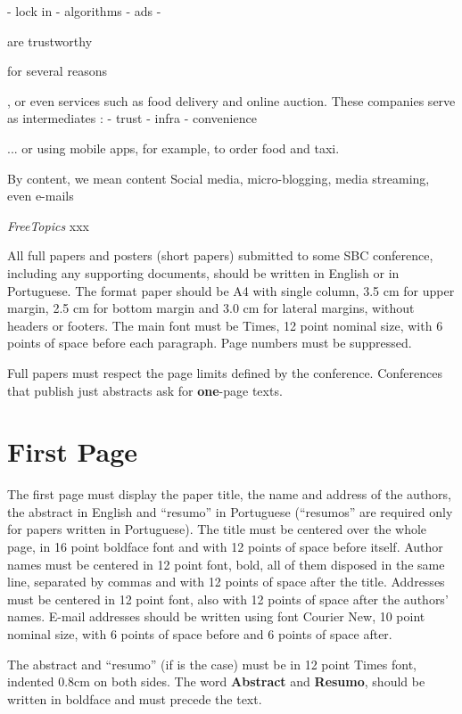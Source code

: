 \documentclass[12pt]{article}
\newcommand{\FC}{\emph{FreeTopics}\xspace}
\begin{document}
- lock in
- algorithms
- ads
- 

are trustworthy


for several reasons



, or even services such as food delivery and
online auction.
These companies serve as intermediates :
    - trust
    - infra
    - convenience

... or using mobile apps, for example, to order food and
taxi.

By content, we mean
content
Social media, micro-blogging, media streaming, even e-mails

\FC xxx

All full papers and posters (short papers) submitted to some SBC conference,
including any supporting documents, should be written in English or in
Portuguese. The format paper should be A4 with single column, 3.5 cm for upper
margin, 2.5 cm for bottom margin and 3.0 cm for lateral margins, without
headers or footers. The main font must be Times, 12 point nominal size, with 6
points of space before each paragraph. Page numbers must be suppressed.

Full papers must respect the page limits defined by the conference.
Conferences that publish just abstracts ask for \textbf{one}-page texts.

\section{First Page} \label{sec:firstpage}

The first page must display the paper title, the name and address of the
authors, the abstract in English and ``resumo'' in Portuguese (``resumos'' are
required only for papers written in Portuguese). The title must be centered
over the whole page, in 16 point boldface font and with 12 points of space
before itself. Author names must be centered in 12 point font, bold, all of
them disposed in the same line, separated by commas and with 12 points of
space after the title. Addresses must be centered in 12 point font, also with
12 points of space after the authors' names. E-mail addresses should be
written using font Courier New, 10 point nominal size, with 6 points of space
before and 6 points of space after.

The abstract and ``resumo'' (if is the case) must be in 12 point Times font,
indented 0.8cm on both sides. The word \textbf{Abstract} and \textbf{Resumo},
should be written in boldface and must precede the text.
\end{document}
